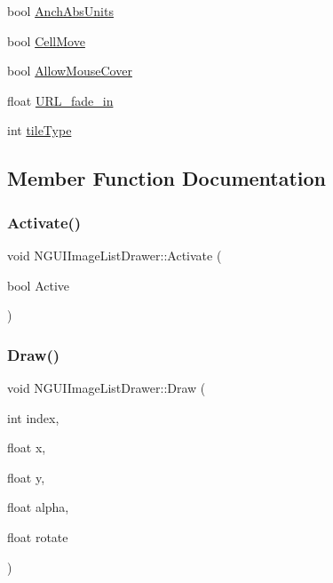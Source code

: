 \begin{DoxyCompactItemize}
\item 
bool \hyperlink{class_n_g_u_i_image_list_drawer_a6dc521c0eb7ee78f745932b71e409569}{Anch\+Abs\+Units}
\item 
bool \hyperlink{class_n_g_u_i_image_list_drawer_a2c33e529dd60dd68bda5d9c4aa8ff474}{Cell\+Move}
\item 
bool \hyperlink{class_n_g_u_i_image_list_drawer_aae762ff03b27a2db3a8c36132d29a414}{Allow\+Mouse\+Cover}
\item 
float \hyperlink{class_n_g_u_i_image_list_drawer_a30d3a8b020219809a0755e7b37b1161b}{U\+R\+L\+\_\+fade\+\_\+in}
\item 
int \hyperlink{class_n_g_u_i_image_list_drawer_a0433866a716e14c58d8d2e011bdcec20}{tile\+Type}
\end{DoxyCompactItemize}


\subsection{Member Function Documentation}
\hypertarget{class_n_g_u_i_image_list_drawer_a00e2fafc98949821365e5bcf2aa06ffa}{}\label{class_n_g_u_i_image_list_drawer_a00e2fafc98949821365e5bcf2aa06ffa} 
\subsubsection{\texorpdfstring{Activate()}{Activate()}}
{\footnotesize\ttfamily void N\+G\+U\+I\+Image\+List\+Drawer\+::\+Activate (\begin{DoxyParamCaption}\item[{bool}]{Active }\end{DoxyParamCaption})}

\hypertarget{class_n_g_u_i_image_list_drawer_acc40e371bb6cbfc91c35d326102ac836}{}\label{class_n_g_u_i_image_list_drawer_acc40e371bb6cbfc91c35d326102ac836} 
\subsubsection{\texorpdfstring{Draw()}{Draw()}\hspace{0.1cm}{\footnotesize\ttfamily [1/3]}}
{\footnotesize\ttfamily void N\+G\+U\+I\+Image\+List\+Drawer\+::\+Draw (\begin{DoxyParamCaption}\item[{int}]{index,  }\item[{float}]{x,  }\item[{float}]{y,  }\item[{float}]{alpha,  }\item[{float}]{rotate }\end{DoxyParamCaption})}

